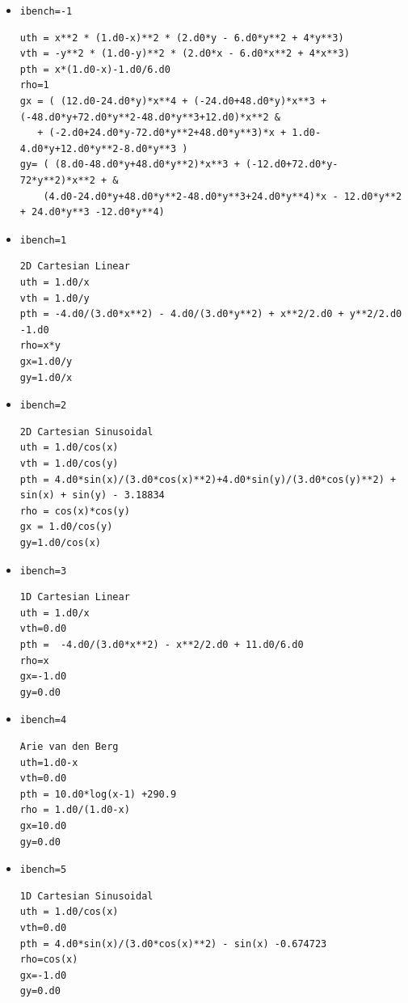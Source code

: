 \begin{itemize}
\item {\tt ibench=-1}
\begin{verbatim}
uth = x**2 * (1.d0-x)**2 * (2.d0*y - 6.d0*y**2 + 4*y**3)
vth = -y**2 * (1.d0-y)**2 * (2.d0*x - 6.d0*x**2 + 4*x**3)
pth = x*(1.d0-x)-1.d0/6.d0
rho=1
gx = ( (12.d0-24.d0*y)*x**4 + (-24.d0+48.d0*y)*x**3 + (-48.d0*y+72.d0*y**2-48.d0*y**3+12.d0)*x**2 &
   + (-2.d0+24.d0*y-72.d0*y**2+48.d0*y**3)*x + 1.d0-4.d0*y+12.d0*y**2-8.d0*y**3 )
gy= ( (8.d0-48.d0*y+48.d0*y**2)*x**3 + (-12.d0+72.d0*y-72*y**2)*x**2 + & 
    (4.d0-24.d0*y+48.d0*y**2-48.d0*y**3+24.d0*y**4)*x - 12.d0*y**2 + 24.d0*y**3 -12.d0*y**4)
\end{verbatim}
\item {\tt ibench=1}
\begin{verbatim}
2D Cartesian Linear
uth = 1.d0/x 
vth = 1.d0/y
pth = -4.d0/(3.d0*x**2) - 4.d0/(3.d0*y**2) + x**2/2.d0 + y**2/2.d0  -1.d0
rho=x*y
gx=1.d0/y
gy=1.d0/x
\end{verbatim}
\item {\tt ibench=2}
\begin{verbatim}
2D Cartesian Sinusoidal
uth = 1.d0/cos(x)
vth = 1.d0/cos(y)
pth = 4.d0*sin(x)/(3.d0*cos(x)**2)+4.d0*sin(y)/(3.d0*cos(y)**2) + sin(x) + sin(y) - 3.18834
rho = cos(x)*cos(y)
gx = 1.d0/cos(y)
gy=1.d0/cos(x)
\end{verbatim}
\item {\tt ibench=3}
\begin{verbatim}
1D Cartesian Linear
uth = 1.d0/x
vth=0.d0
pth =  -4.d0/(3.d0*x**2) - x**2/2.d0 + 11.d0/6.d0
rho=x
gx=-1.d0
gy=0.d0
\end{verbatim}
\item {\tt ibench=4}
\begin{verbatim}
Arie van den Berg
uth=1.d0-x
vth=0.d0
pth = 10.d0*log(x-1) +290.9 
rho = 1.d0/(1.d0-x)
gx=10.d0
gy=0.d0
\end{verbatim}
\item {\tt ibench=5}
\begin{verbatim}
1D Cartesian Sinusoidal
uth = 1.d0/cos(x)
vth=0.d0
pth = 4.d0*sin(x)/(3.d0*cos(x)**2) - sin(x) -0.674723
rho=cos(x)
gx=-1.d0
gy=0.d0
\end{verbatim}
\end{itemize}

